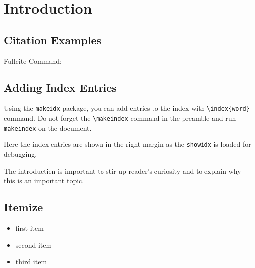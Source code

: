 
\chapter{Introduction}\label{chapterIntroduction}

\section{Citation Examples}

\cite[635-637]{Beck1995}

\cite[430]{Putnam1988}

Fullcite-Command:



\section{Adding Index Entries}

Using the \verb|makeidx| package, you can add entries to the index with \verb|\index{word}| command.
Do not forget the \verb|\makeindex| command in the preamble and run \verb|makeindex| on the document.

Here the index entries are shown in the right margin as the \verb|showidx| is loaded for debugging.

The introduction is important to stir up reader's curiosity and to explain why this is an important topic.\\


\section{Itemize}

\begin{itemize}
	\item first item
	\item second item
	\item third item
\end{itemize}